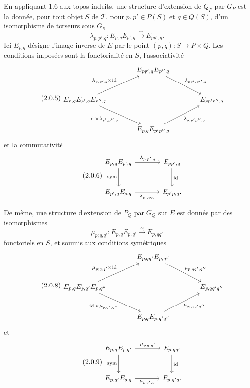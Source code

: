 \documentclass[11pt]{article}
\providecommand{\id}{\operatorname{id}}
\begin{document}
En appliquant 1.6 aux topos induits, une structure d'extension de \(Q_P\) par \(G_P\) est la donnée, pour tout objet \(S\) de \(\mathcal T\), pour \(p,p'\in P(S)\) et \(q\in Q(S)\), d'un isomorphisme de torseurs sous \(G_S\)
\begin{equation}\tag{2.0.4}
  \lambda_{p,p';q}:E_{p,q}E_{p',q}\xrightarrow{\sim}E_{pp',q}.
\end{equation}
Ici \(E_{p,q}\) désigne l'image inverse de \(E\) par le point \((p,q):S\to P\times Q\).  Les conditions imposées sont la fonctorialité en \(S\), l'associativité
\begin{equation}\tag{2.0.5}
\begin{tikzcd}[column sep=large,row sep=large]
& E_{pp',q}E_{p'',q}\arrow[dr,"\lambda_{pp',p'';q}"]&\\
E_{p,q}E_{p',q}E_{p'',q}
\arrow[ur,"\lambda_{p,p';q}\times\id"]
\arrow[dr,"\id\times\lambda_{p',p'';q}"']&&E_{pp'p'',q}\\
& E_{p,q}E_{p'p'',q}\arrow[ur,"\lambda_{p,p'p'';q}"']&
\end{tikzcd}
\end{equation}
et la commutativité
\begin{equation}\tag{2.0.6}
\begin{tikzcd}[column sep=large,row sep=large]
E_{p,q}E_{p',q}\arrow[r,"\lambda_{p,p';q}"]\arrow[d,"\sym"']&E_{pp',q}\arrow[d,"\id"]\\
E_{p',q}E_{p,q}\arrow[r,"\lambda_{p',p;q}"']&E_{p'p,q}.
\end{tikzcd}
\end{equation}

De même, une structure d'extension de \(P_Q\) par \(G_Q\) sur \(E\) est donnée par des isomorphismes
\begin{equation}\tag{2.0.7}
  \mu_{p;q,q'}:E_{p,q}E_{p,q'}\xrightarrow{\sim}E_{p,qq'}
\end{equation}
fonctoriels en \(S\), et soumis aux conditions symétriques
\begin{equation}\tag{2.0.8}
\begin{tikzcd}[column sep=large,row sep=large]
& E_{p,qq'}E_{p,q''}\arrow[dr,"\mu_{p;qq',q''}"]&\\
E_{p,q}E_{p,q'}E_{p,q''}
\arrow[ur,"\mu_{p;q,q'}\times\id"]
\arrow[dr,"\id\times\mu_{p;q',q''}"']&&E_{p,qq'q''}\\
& E_{p,q}E_{p,q'q''}\arrow[ur,"\mu_{p;q,q'q''}"']&
\end{tikzcd}
\end{equation}
et
\begin{equation}\tag{2.0.9}
\begin{tikzcd}[column sep=large,row sep=large]
E_{p,q}E_{p,q'}\arrow[r,"\mu_{p;q,q'}"]\arrow[d,"\sym"']&E_{p,qq'}\arrow[d,"\id"]\\
E_{p,q'}E_{p,q}\arrow[r,"\mu_{p;q',q}"']&E_{p,q'q}.
\end{tikzcd}
\end{equation}
\end{document}
